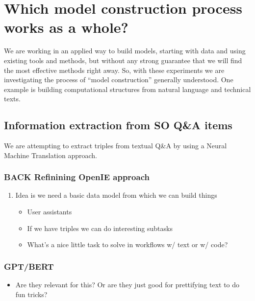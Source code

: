 \documentclass[11pt]{article}
\begin{document}
\section{Which model construction process works as a whole?}
\label{sec:orgfcda6e7}
We are working in an applied way to build models, starting with data
and using existing tools and methods, but without any strong guarantee
that we will find the most effective methods right away. So, with
these experiments we are investigating the process of “model
construction” generally understood. One example is building
computational structures from natural language and technical texts.

\subsection{Information extraction from SO Q\&A items}
\label{sec:org759a4c4}
We are attempting to extract triples from textual Q\&A by using a
Neural Machine Translation approach.

\subsubsection{{\bfseries\sffamily BACK} Refinining OpenIE approach}
\label{sec:org4754d2d}

\begin{enumerate}
\item Idea is we need a basic data model from which we can build things
\label{sec:orgbf557eb}

\begin{itemize}
\item User assistants
\item If we have triples we can do interesting subtasks
\item What’s a nice little task to solve in workflows w/ text or w/ code?
\end{itemize}
\end{enumerate}

\subsubsection{GPT/BERT}
\label{sec:org97c0542}

\begin{itemize}
\item Are they relevant for this? Or are they just good for prettifying
text to do fun tricks?
\end{itemize}
\end{document}
